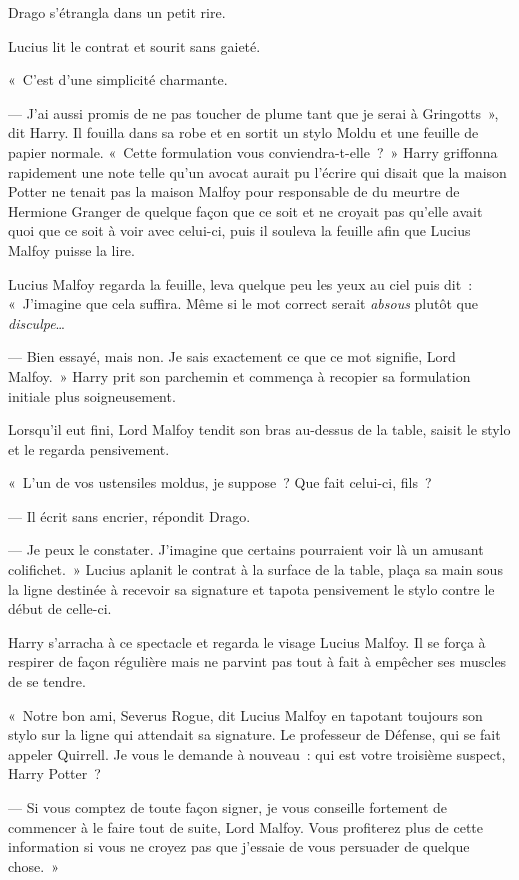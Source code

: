 Drago s'étrangla dans un petit rire.

Lucius lit le contrat et sourit sans gaieté.

«~C'est d'une simplicité charmante.

--- J'ai aussi promis de ne pas toucher de plume tant que je serai à Gringotts~», dit Harry.
Il fouilla dans sa robe et en sortit un stylo Moldu et une feuille de papier normale.
«~Cette formulation vous conviendra-t-elle~?~»
Harry griffonna rapidement une note telle qu'un avocat aurait pu l'écrire qui disait que la maison Potter ne tenait pas la maison Malfoy pour responsable de du meurtre de Hermione Granger de quelque façon que ce soit et ne croyait pas qu'elle avait quoi que ce soit à voir avec celui-ci, puis il souleva la feuille afin que Lucius Malfoy puisse la lire.

Lucius Malfoy regarda la feuille, leva quelque peu les yeux au ciel puis dit~:
«~J'imagine que cela suffira.
Même si le mot correct serait \emph{absous} plutôt que \emph{disculpe}…

--- Bien essayé, mais non.
Je sais exactement ce que ce mot signifie, Lord Malfoy.~»
Harry prit son parchemin et commença à recopier sa formulation initiale plus soigneusement.

Lorsqu'il eut fini, Lord Malfoy tendit son bras au-dessus de la table, saisit le stylo et le regarda pensivement.

«~L'un de vos ustensiles moldus, je suppose~?
Que fait celui-ci, fils~?

--- Il écrit sans encrier, répondit Drago.

--- Je peux le constater.
J'imagine que certains pourraient voir là un amusant colifichet.~»
Lucius aplanit le contrat à la surface de la table, plaça sa main sous la ligne destinée à recevoir sa signature et tapota pensivement le stylo contre le début de celle-ci.

Harry s'arracha à ce spectacle et regarda le visage Lucius Malfoy.
Il se força à respirer de façon régulière mais ne parvint pas tout à fait à empêcher ses muscles de se tendre.

«~Notre bon ami, Severus Rogue, dit Lucius Malfoy en tapotant toujours son stylo sur la ligne qui attendait sa signature.
Le professeur de Défense, qui se fait appeler Quirrell.
Je vous le demande à nouveau~: qui est votre troisième suspect, Harry Potter~?

--- Si vous comptez de toute façon signer, je vous conseille fortement de commencer à le faire tout de suite, Lord Malfoy.
Vous profiterez plus de cette information si vous ne croyez pas que j'essaie de vous persuader de quelque chose.~»

